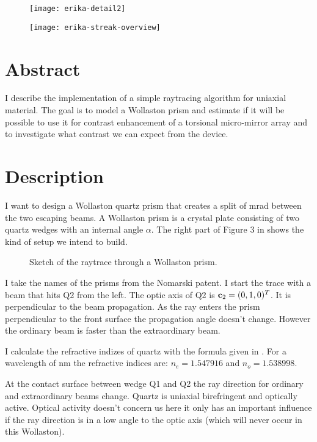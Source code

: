 \begin{figure}[htbp]
  \centering
  \texttt{[image: erika-detail2]}
  \caption{}
  \label{fig:detail2}
\end{figure}

\begin{figure}[htbp]
  \centering
  \texttt{[image: erika-streak-overview]}
  \caption{}
  \label{fig:streak}
\end{figure}

\section{Abstract}
I describe the implementation of a simple raytracing algorithm for
uniaxial material.  The goal is to model a Wollaston prism and
estimate if it will be possible to use it for contrast enhancement of
a torsional micro-mirror array and to investigate what contrast we can
expect from the device.
\section{Description}
I want to design a Wollaston quartz prism that creates a split of
\unit[32]{mrad} between the two escaping beams.  A Wollaston prism is
a crystal plate consisting of two quartz wedges with an internal angle
$\alpha$. The right part of Figure 3 in \citep{Nomarski1960} shows the kind
of setup we intend to build. 
\begin{figure}[htbp]
  \centering
  
  \caption{Sketch of the raytrace through a Wollaston prism.}
\end{figure}
I take the names of the prisms from the Nomarski patent. I start the
trace with a beam that hits Q2 from the left. The optic axis of Q2 is
$\mathbf{c}_2=(0,1,0)^T$. It is perpendicular to the beam propagation. As
the ray enters the prism perpendicular to the front surface the
propagation angle doesn't change. However the ordinary beam is faster
than the extraordinary beam.

I calculate the refractive indizes of quartz with the formula given in
\citep{Ghosh1999}. For a wavelength of \unit[768]{nm} the refractive indices
are: $n_e=1.547916$ and $n_o=1.538998$.

At the contact surface between wedge Q1 and Q2 the ray direction for
ordinary and extraordinary beams change. Quartz is uniaxial
birefringent and optically active. Optical activity doesn't concern us
here it only has an important influence if the ray direction is in a
low angle to the optic axis (which will never occur in this Wollaston).

